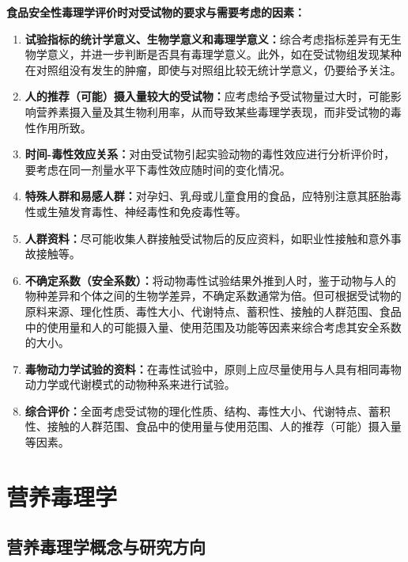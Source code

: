 \begin{defbox}
\textbf{食品安全性毒理学评价时对受试物的要求与需要考虑的因素：}
\begin{enumerate}[leftmargin=*]
    \item \textbf{试验指标的统计学意义、生物学意义和毒理学意义：}综合考虑指标差异有无生物学意义，并进一步判断是否具有毒理学意义。此外，如在受试物组发现某种在对照组没有发生的肿瘤，即使与对照组比较无统计学意义，仍要给予关注。
    \item \textbf{人的推荐（可能）摄入量较大的受试物：}应考虑给予受试物量过大时，可能影响营养素摄入量及其生物利用率，从而导致某些毒理学表现，而非受试物的毒性作用所致。
    \item \textbf{时间-毒性效应关系：}对由受试物引起实验动物的毒性效应进行分析评价时，要考虑在同一剂量水平下毒性效应随时间的变化情况。
    \item \textbf{特殊人群和易感人群：}对孕妇、乳母或儿童食用的食品，应特别注意其胚胎毒性或生殖发育毒性、神经毒性和免疫毒性等。
    \item \textbf{人群资料：}尽可能收集人群接触受试物后的反应资料，如职业性接触和意外事故接触等。
    \item \textbf{不确定系数（安全系数）：}将动物毒性试验结果外推到人时，鉴于动物与人的物种差异和个体之间的生物学差异，不确定系数通常为倍。但可根据受试物的原料来源、理化性质、毒性大小、代谢特点、蓄积性、接触的人群范围、食品中的使用量和人的可能摄入量、使用范围及功能等因素来综合考虑其安全系数的大小。
    \item \textbf{毒物动力学试验的资料：}在毒性试验中，原则上应尽量使用与人具有相同毒物动力学或代谢模式的动物种系来进行试验。
    \item \textbf{综合评价：}全面考虑受试物的理化性质、结构、毒性大小、代谢特点、蓄积性、接触的人群范围、食品中的使用量与使用范围、人的推荐（可能）摄入量等因素。
\end{enumerate}
\end{defbox}

\section{营养毒理学}

\subsection{营养毒理学概念与研究方向}

